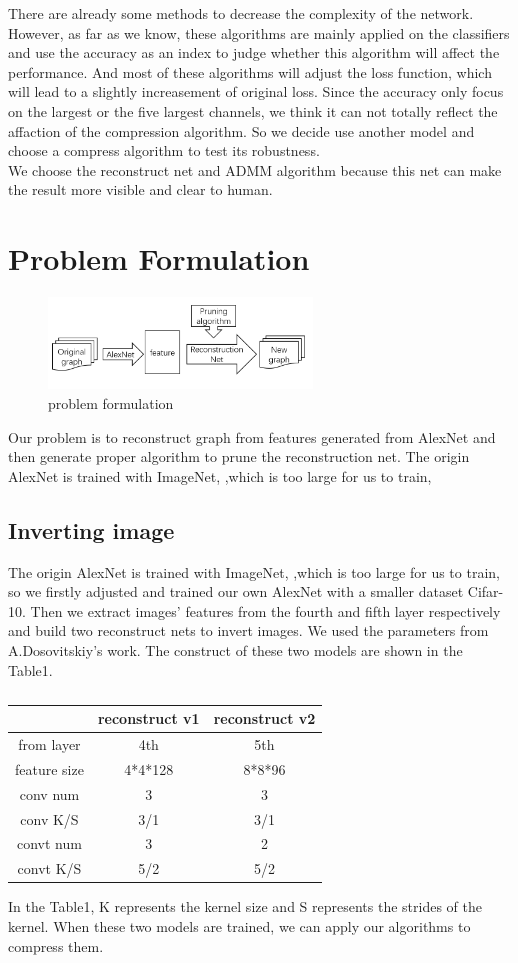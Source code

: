 \documentclass{acmtog} %
\begin{document}
There are already some methods to decrease the complexity of the network. However, as far as we know, these algorithms are mainly applied on the classifiers and use the accuracy as an index to judge whether this algorithm will affect the performance. And most of these algorithms will adjust the loss function, which will lead to a slightly increasement of original loss. Since the accuracy only focus on the largest or the five largest channels, we think it can not totally reflect the affaction of the compression algorithm. So we decide use another model and choose a compress algorithm to test its robustness.\\

We choose the reconstruct net and ADMM algorithm because this net can make the result more visible and clear to human.
\section{Problem Formulation}
\label{sec:problem_formulation}

\begin{figure}[h]
  \centerline{\includegraphics[width=7cm]{graph/pf_4.png}}
  \caption{problem formulation}
\end{figure}
Our problem is to reconstruct graph from features generated from AlexNet and then generate proper algorithm to prune the reconstruction net.
The origin AlexNet is trained with ImageNet, ,which is too large for us to train, \subsection{Inverting image}
The origin AlexNet is trained with ImageNet, ,which is too large for us to train, so we firstly adjusted and trained our own AlexNet with a smaller dataset Cifar-10. Then we extract images' features from the fourth and fifth layer respectively and build two reconstruct nets to invert images. We used the parameters from A.Dosovitskiy's work. The construct of these two models are shown in the Table1.\\
\begin{table}
\centering 
\begin{tabular}{c|c|c}
\hline
&reconstruct v1&reconstruct v2\\
\hline
from layer&4th&5th\\
\hline
feature size&4*4*128&8*8*96\\
\hline
conv num&3&3\\
\hline
conv K/S&3/1&3/1\\
\hline
convt num&3&2\\
\hline
convt K/S&5/2&5/2\\
\hline
\end{tabular}
\caption{}
\end{table}
In the Table1, K represents the kernel size and S represents the strides of the kernel. When these two models are trained, we can apply our algorithms to compress them.
\end{document}
